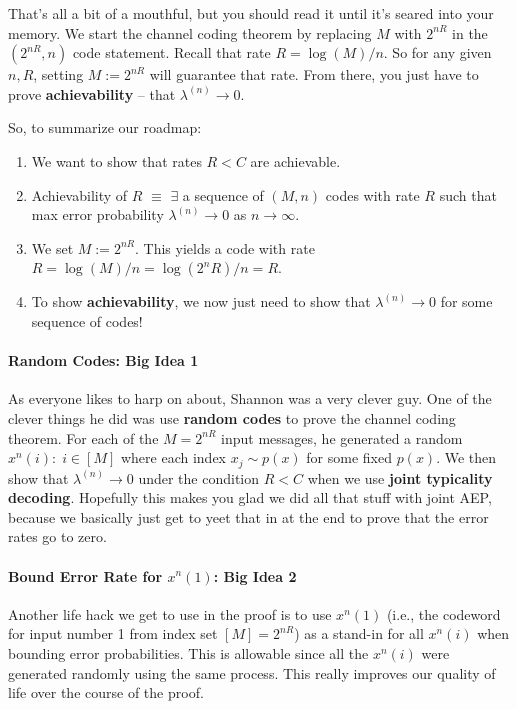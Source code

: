 \documentclass[a4paper,12pt]{report}
\begin{document}
That's all a bit of a mouthful, but you should read it until it's seared into
your memory. We start the channel coding theorem by replacing $M$ with $2^{nR}$
in the $(2^{nR}, n)$ code statement. Recall that rate $R = \log(M) / n$. So for
any given $n, R$, setting $M := 2^{nR}$ will guarantee that rate. From there,
you just have to prove \textbf{achievability} -- that $\lambda^{(n)} \to 0$.

So, to summarize our roadmap: 
\begin{enumerate}
\item We want to show that rates $R < C$ are achievable. 
\item Achievability of $R$ $\equiv$ $\exists$ a sequence of $(M, n)$ codes with
rate $R$ such that max error probability $\lambda^{(n)} \to 0$ as $n\to \infty$.
\item We set $M := 2^{nR}$. This yields a code with rate $R = \log (M)/n =
\log(2^nR)/n = R$. 
\item To show \textbf{achievability}, we now just need to show that
$\lambda^{(n)} \to 0$ for some sequence of codes!
\end{enumerate}


\paragraph{Random Codes: Big Idea 1 } As everyone likes to harp on about,
Shannon was a very clever guy. One of the clever things he did was use
\textbf{random codes} to prove the channel coding theorem. For each of the $M =
2^{nR}$ input messages, he generated a random $x^n(i):\; i\in [M]$ where each
index $x_j\sim p(x)$ for some fixed $p(x)$. We then show that $\lambda^{(n)} \to
0$ under the condition $R < C$ when we use \textbf{joint typicality decoding}.
Hopefully this makes you glad we did all that stuff with joint AEP, because we
basically just get to yeet that in at the end to prove that the error rates go
to zero. 


\paragraph{Bound Error Rate for $x^n(1)$: Big Idea 2 } Another life hack we get
to use in the proof is to use $x^n(1)$ (i.e., the codeword for input number 1
from index set $[M] = 2^{nR}$) as a stand-in for all $x^n(i)$ when bounding
error probabilities. This is allowable since all the $x^n(i)$ were generated
randomly using the same process. This really improves our quality of life over
the course of the proof. 
\end{document}
